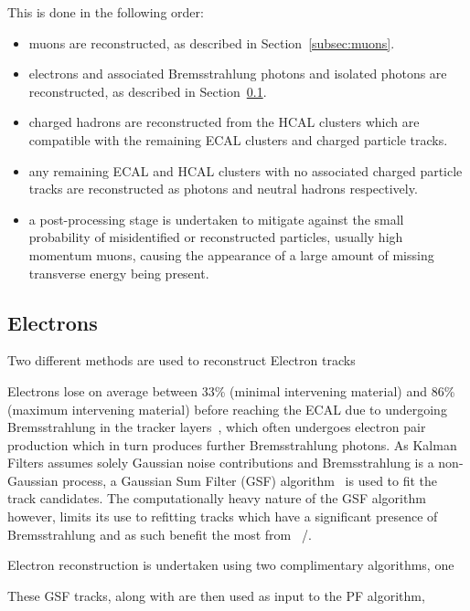 {This is done in the following order: 
\begin{itemize}
\item muons are reconstructed, as described in Section~\ref{subsec:muons}.
\item electrons and associated Bremsstrahlung photons and isolated photons are reconstructed, as described in Section~\ref{subsec:electrons}.
\item charged hadrons are reconstructed from the HCAL clusters which are compatible with the remaining ECAL clusters and charged particle tracks.
\item any remaining ECAL and HCAL clusters with no associated charged particle tracks are reconstructed as photons and neutral hadrons respectively.
\item a post-processing stage is undertaken to mitigate against the small probability of misidentified or reconstructed particles, usually high momentum muons, causing the appearance of a large amount of missing transverse energy being present.
\end{itemize}

\subsection{Electrons}\label{subsec:electrons}
Two different methods are used to reconstruct Electron tracks

\begin{itemize}

\end{itemize}

Electrons lose on average between 33\% (minimal intervening material) and 86\% (maximum intervening material) before reaching the ECAL due to undergoing Bremsstrahlung in the tracker layers~\cite{Khachatryan:2015hwa}, which often undergoes electron pair production which in turn produces further Bremsstrahlung photons.
As Kalman Filters assumes solely Gaussian noise contributions and Bremsstrahlung is a non-Gaussian process, a Gaussian Sum Filter (GSF) algorithm~\cite{Adam:2003eca} is used to fit the track candidates.
The computationally heavy nature of the GSF algorithm however, limits its use to refitting \KF tracks which have a significant presence of Bremsstrahlung and as such benefit the most from ~/\cite{Khachatryan:2015hwa}.

Electron reconstruction is undertaken using two complimentary algorithms, one

These GSF tracks, along with  are then used as input to the PF algorithm, 

}
